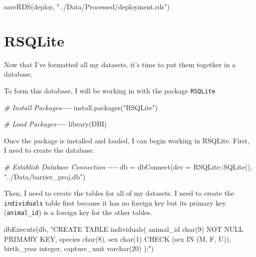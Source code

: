 \documentclass[
]{book}
\newenvironment{Shaded}{\begin{snugshade}}{\end{snugshade}}
\newcommand{\AttributeTok}[1]{\textcolor[rgb]{0.77,0.63,0.00}{#1}}
\newcommand{\CommentTok}[1]{\textcolor[rgb]{0.56,0.35,0.01}{\textit{#1}}}
\newcommand{\FunctionTok}[1]{\textcolor[rgb]{0.00,0.00,0.00}{#1}}
\newcommand{\NormalTok}[1]{#1}
\newcommand{\OtherTok}[1]{\textcolor[rgb]{0.56,0.35,0.01}{#1}}
\newcommand{\SpecialCharTok}[1]{\textcolor[rgb]{0.00,0.00,0.00}{#1}}
\newcommand{\StringTok}[1]{\textcolor[rgb]{0.31,0.60,0.02}{#1}}
\begin{document}
\begin{Shaded}
\begin{Highlighting}[]
\FunctionTok{saveRDS}\NormalTok{(deploy, }\StringTok{"../Data/Processed/deployment.rds"}\NormalTok{)}
\end{Highlighting}
\end{Shaded}

\hypertarget{rsqlite}{%
\section{RSQLite}\label{rsqlite}}

Now that I've formatted all my datasets, it's time to put them together in a database.

To form this database, I will be working in with the package \texttt{RSQLite}

\begin{Shaded}
\begin{Highlighting}[]
\CommentTok{\# Install Packages{-}{-}{-}{-}}
\FunctionTok{install.packages}\NormalTok{(}\StringTok{"RSQLite"}\NormalTok{)}
\end{Highlighting}
\end{Shaded}

\begin{Shaded}
\begin{Highlighting}[]
\CommentTok{\# Load Packages{-}{-}{-}{-}}
\FunctionTok{library}\NormalTok{(DBI)}
\end{Highlighting}
\end{Shaded}

Once the package is installed and loaded, I can begin working in RSQLite. First, I need to create the database.

\begin{Shaded}
\begin{Highlighting}[]
\CommentTok{\# Establish Database Connection {-}{-}{-}{-}}
\NormalTok{db }\OtherTok{=} \FunctionTok{dbConnect}\NormalTok{(}\AttributeTok{drv =}\NormalTok{ RSQLite}\SpecialCharTok{::}\FunctionTok{SQLite}\NormalTok{(), }\StringTok{"../Data/barrier\_proj.db"}\NormalTok{)}
\end{Highlighting}
\end{Shaded}

Then, I need to create the tables for all of my datasets. I need to create the \texttt{individuals} table first because it has no foreign key but its primary key (\texttt{animal\_id}) is a foreign key for the other tables.

\begin{Shaded}
\begin{Highlighting}[]
\FunctionTok{dbExecute}\NormalTok{(db, }
  \StringTok{"CREATE TABLE individuals(}
\StringTok{  animal\_id char(9) NOT NULL PRIMARY KEY,}
\StringTok{  species char(8), }
\StringTok{  sex char(1) CHECK (sex IN (\textquotesingle{}M\textquotesingle{}, \textquotesingle{}F\textquotesingle{}, \textquotesingle{}U\textquotesingle{})),}
\StringTok{  birth\_year integer,}
\StringTok{  capture\_unit varchar(20)}
\StringTok{  );"}\NormalTok{)}
\end{Highlighting}
\end{Shaded}
\end{document}
